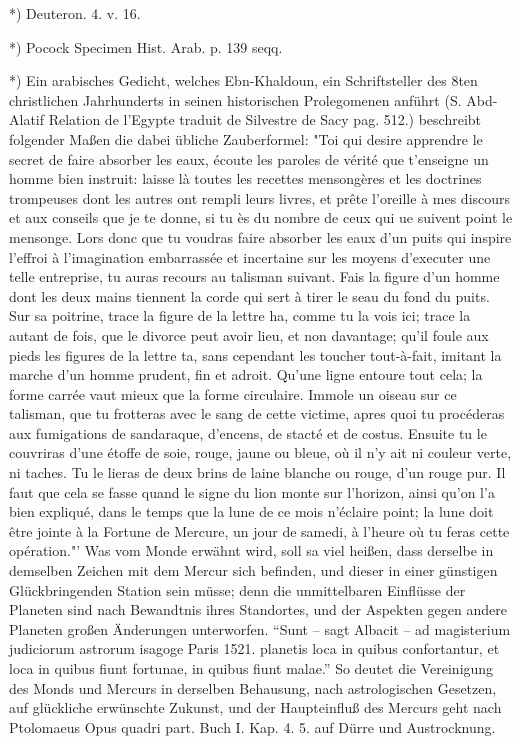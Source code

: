 \documentclass[a4paper, 11pt, oneside, polutonikogreek, german]{article}
\begin{document}
*) Deuteron. 4. v. 16.

*) Pocock Specimen Hist. Arab. p. 139 seqq.

*) Ein arabisches Gedicht, welches Ebn-Khaldoun, ein Schriftsteller des 8ten christlichen Jahrhunderts in seinen historischen Prolegomenen anführt (S. Abd-Alatif Relation de l'Egypte traduit de Silvestre de Sacy pag. 512.) beschreibt folgender Maßen die dabei übliche Zauberformel:
"Toi qui desire apprendre le secret de faire absorber les eaux, écoute les paroles de vérité que t'enseigne un homme bien instruit: laisse là toutes les recettes mensongères et les doctrines trompeuses dont les autres ont rempli leurs livres, et prête l'oreille à mes discours et aux conseils que je te donne, si tu ès du nombre de ceux qui ue suivent point le mensonge. Lors donc que tu voudras faire absorber les eaux d'un puits qui inspire l'effroi à l'imagination embarrassée et incertaine sur les moyens d'executer une telle entreprise, tu auras recours au talisman suivant. Fais la figure d'un homme dont les deux mains tiennent la corde qui sert à tirer le seau du fond du puits. Sur sa poitrine, trace la figure de la lettre ha, comme tu la vois ici; trace la autant de fois, que le divorce peut avoir lieu, et non davantage; qu'il foule aux pieds les figures de la lettre ta, sans cependant les toucher tout-à-fait, imitant la marche d'un homme prudent, fin et adroit. Qu'une ligne entoure tout cela; la forme carrée vaut mieux que la forme circulaire. Immole un oiseau sur ce talisman, que tu frotteras avec le sang de cette victime, apres quoi tu procéderas aux fumigations de sandaraque, d'encens, de stacté et de costus. Ensuite tu le couvriras d'une étoffe de soie, rouge, jaune ou bleue, où il n'y ait ni couleur verte, ni taches. Tu le lieras de deux brins de laine blanche ou rouge, d'un rouge pur. Il faut que cela se fasse quand le signe du lion monte sur l'horizon, ainsi qu'on l'a bien expliqué, dans le temps que la lune de ce mois n'éclaire point; la lune doit être jointe à la Fortune de Mercure, un jour de samedi, à l'heure où tu feras cette opération."'
Was vom Monde erwähnt wird, soll sa viel heißen, dass derselbe in demselben Zeichen mit dem Mercur sich befinden, und dieser in einer günstigen Glückbringenden Station sein müsse; denn die unmittelbaren Einflüsse der Planeten sind nach Bewandtnis ihres Standortes, und der Aspekten gegen andere Planeten großen Änderungen unterworfen. "`Sunt -- sagt Albacit -- ad magisterium judiciorum astrorum isagoge Paris 1521. planetis loca in quibus confortantur, et loca in quibus fiunt fortunae, in quibus fiunt malae."' So deutet die Vereinigung des Monds und Mercurs in derselben Behausung, nach astrologischen Gesetzen, auf glückliche erwünschte Zukunst, und der Haupteinfluß des Mercurs geht nach Ptolomaeus Opus quadri part. Buch I. Kap. 4. 5. auf Dürre und Austrocknung.
\end{document}
